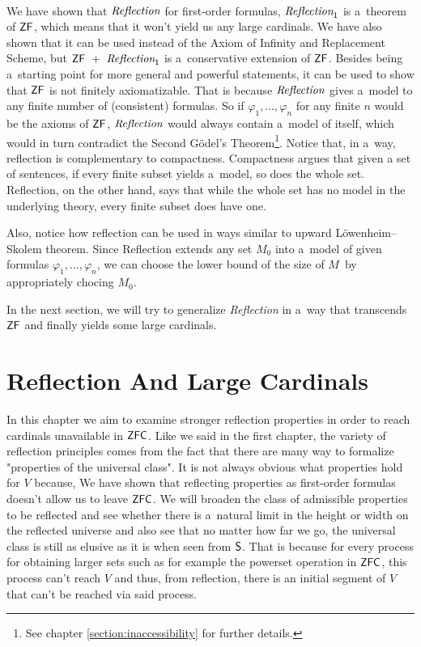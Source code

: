 \documentclass[12pt,a4paper]{article}
\begin{document}
\

We have shown that $\emph{Reflection}$ for first-order formulas, $\emph{Reflection}_1$ is a~theorem of $\sf{ZF}$, which means that it won't yield us any large cardinals. We have also shown that it can be used instead of the Axiom of Infinity and Replacement Scheme, but $\sf{ZF}\ +\ \emph{Reflection}_1$ is a~conservative extension of $\sf{ZF}$. Besides being a~starting point for more general and powerful statements, it can be used to show that $\sf{ZF}$ is not finitely axiomatizable. That is because $\emph{Reflection}$ gives a~model to any finite number of (consistent) formulas. So if $\varphi_1, \ldots, \varphi_n$ for any finite $n$ would be the axioms of $\sf{ZF}$, $\emph{Reflection}$ would always contain a~model of itself, which would in turn contradict the Second Gödel's Theorem\footnote{See chapter \ref{section:inaccessibility} for further details.}.
Notice that, in a~way, reflection is complementary to compactness. Compactness argues that given a set of sentences, if every finite subset yields a~model, so does the whole set. Reflection, on the other hand, says that while the whole set has no model in the underlying theory, every finite subset does have one.

Also, notice how reflection can be used in ways similar to upward Löwenheim–Skolem theorem. Since Reflection extends any set $M_0$ into a~model of given formulas $\varphi_1, \ldots, \varphi_n$, we can choose the lower bound of the size of $M$ by appropriately chocing $M_0$.

In the next section, we will try to generalize \emph{Reflection} in a~way that transcends $\sf{ZF}$ and finally yields some large cardinals.

\newpage
\section{Reflection And Large Cardinals}

In this chapter we aim to examine stronger reflection properties in order to reach cardinals unavailable in $\sf{ZFC}$. Like we said in the first chapter, %
the variety of reflection principles comes from the fact that there are many way to formalize "properties of the universal class". It is not always obvious what properties hold for $V$ because, 
We have shown that reflecting properties as first-order formulas doesn't allow us to leave $\sf{ZFC}$. We will broaden the class of admissible properties to be reflected and see whether there is a~natural limit in the height or width on the reflected universe and also see that no matter how far we go, the universal class is still as elusive as it is when seen from $\sf{S}$. That is because for every process for obtaining larger sets such as for example the powerset operation in $\sf{ZFC}$, this process can't reach $V$ and thus, from reflection, there is an initial segment of $V$ that can't be reached via said process. 
\end{document}
